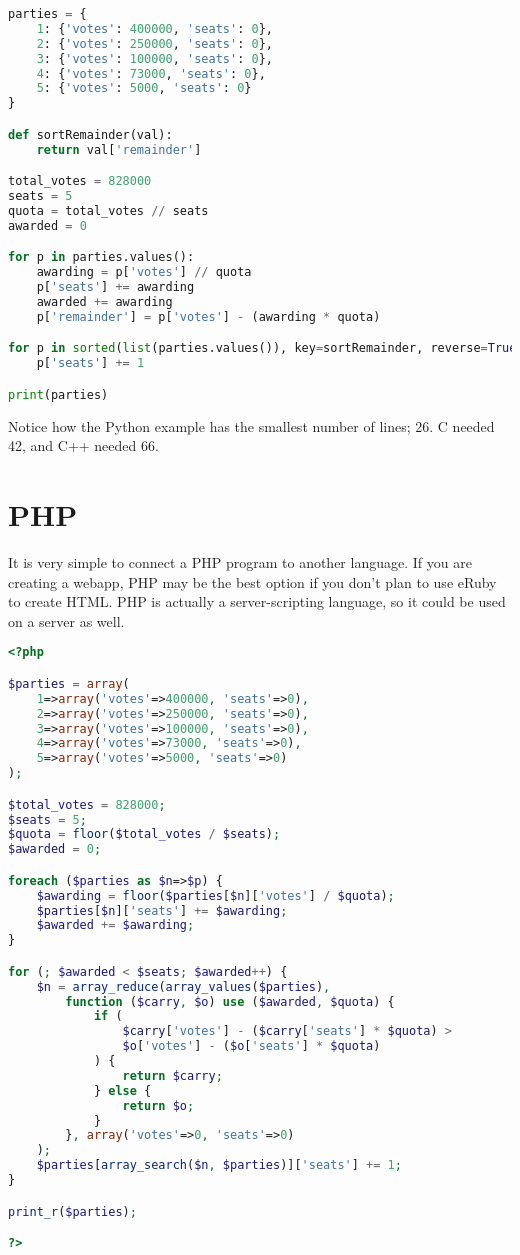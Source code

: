 \documentclass{article}
\begin{document}
    \begin{lstlisting}[language=Python]
parties = {
    1: {'votes': 400000, 'seats': 0},
    2: {'votes': 250000, 'seats': 0},
    3: {'votes': 100000, 'seats': 0},
    4: {'votes': 73000, 'seats': 0},
    5: {'votes': 5000, 'seats': 0}
}

def sortRemainder(val):
    return val['remainder']

total_votes = 828000
seats = 5
quota = total_votes // seats
awarded = 0

for p in parties.values():
    awarding = p['votes'] // quota
    p['seats'] += awarding
    awarded += awarding
    p['remainder'] = p['votes'] - (awarding * quota)

for p in sorted(list(parties.values()), key=sortRemainder, reverse=True)[:seats-awarded]:
    p['seats'] += 1

print(parties)
    \end{lstlisting}

    Notice how the Python example has the smallest number of lines; 26. C needed 42, and C++ needed 66.

    \section{PHP}

    It is very simple to connect a PHP program to another language. If you are creating a webapp, PHP may be the best option if you don't plan to use eRuby to create HTML. PHP is actually a server-scripting language, so it could be used on a server as well. 

    \begin{lstlisting}[language=PHP]
<?php

$parties = array(
    1=>array('votes'=>400000, 'seats'=>0),
    2=>array('votes'=>250000, 'seats'=>0),
    3=>array('votes'=>100000, 'seats'=>0),
    4=>array('votes'=>73000, 'seats'=>0),
    5=>array('votes'=>5000, 'seats'=>0)
);

$total_votes = 828000;
$seats = 5;
$quota = floor($total_votes / $seats);
$awarded = 0;

foreach ($parties as $n=>$p) {
    $awarding = floor($parties[$n]['votes'] / $quota);
    $parties[$n]['seats'] += $awarding;
    $awarded += $awarding;
}

for (; $awarded < $seats; $awarded++) {
    $n = array_reduce(array_values($parties), 
        function ($carry, $o) use ($awarded, $quota) {
            if (
                $carry['votes'] - ($carry['seats'] * $quota) > 
                $o['votes'] - ($o['seats'] * $quota)
            ) {
                return $carry;
            } else {
                return $o;
            }
        }, array('votes'=>0, 'seats'=>0)
    );
    $parties[array_search($n, $parties)]['seats'] += 1;
}

print_r($parties);

?>
    \end{lstlisting}
\end{document}
